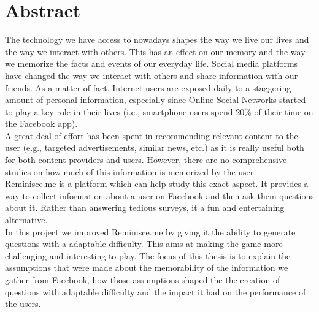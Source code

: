 

\cleardoublepage
\chapter*{Abstract}
The technology we have access to nowadays shapes the way we live our lives and the way we interact with others. This has an effect on our memory and the way we memorize the facts and events of our everyday life. Social media platforms have changed the way we interact with others and share information with our friends. As a matter of fact, Internet users are exposed daily to a staggering amount of personal information, especially since Online Social Networks started to play a key role in their lives (i.e., smartphone users spend 20\% of their time on the Facebook app).\\
A great deal of effort has been spent in recommending relevant content to the user (e.g., targeted advertisements, similar news, etc.) as it is really useful both for both content providers and users. However, there are no comprehensive studies on how much of this information is memorized by the user.\\
Reminisce.me is a platform which can help study this exact aspect. It provides a way to collect information about a user on Facebook and then ask them questions about it. Rather than answering tedious surveys, it  a fun and entertaining alternative.\\
In this project we improved Reminisce.me by giving it the ability to generate questions with a adaptable difficulty. This aims at making the game more challenging and interesting to play. The focus of this thesis is to explain the assumptions that were made about the memorability of the information we gather from Facebook, how those assumptions shaped the the creation of questions with adaptable difficulty and the impact it had on the performance of the users.

